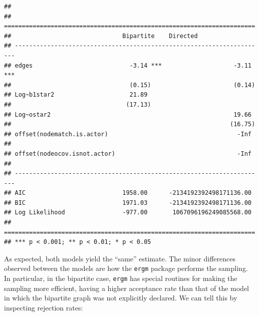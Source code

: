 \documentclass[]{book}
\newenvironment{Shaded}{\begin{snugshade}}{\end{snugshade}}
\newcommand{\DataTypeTok}[1]{\textcolor[rgb]{0.13,0.29,0.53}{#1}}
\newcommand{\DecValTok}[1]{\textcolor[rgb]{0.00,0.00,0.81}{#1}}
\newcommand{\ErrorTok}[1]{\textcolor[rgb]{0.64,0.00,0.00}{\textbf{#1}}}
\newcommand{\KeywordTok}[1]{\textcolor[rgb]{0.13,0.29,0.53}{\textbf{#1}}}
\newcommand{\NormalTok}[1]{#1}
\newcommand{\OperatorTok}[1]{\textcolor[rgb]{0.81,0.36,0.00}{\textbf{#1}}}
\newcommand{\StringTok}[1]{\textcolor[rgb]{0.31,0.60,0.02}{#1}}
\begin{document}
\begin{verbatim}
## 
## ======================================================================
##                               Bipartite    Directed                   
## ----------------------------------------------------------------------
## edges                           -3.14 ***                    -3.11 ***
##                                 (0.15)                       (0.14)   
## Log~b1star2                     21.89                                 
##                                (17.13)                                
## Log~ostar2                                                   19.66    
##                                                             (16.75)   
## offset(nodematch.is.actor)                                    -Inf    
##                                                                       
## offset(nodeocov.isnot.actor)                                  -Inf    
##                                                                       
## ----------------------------------------------------------------------
## AIC                           1958.00      -2134192392498171136.00    
## BIC                           1971.03      -2134192392498171136.00    
## Log Likelihood                -977.00       1067096196249085568.00    
## ======================================================================
## *** p < 0.001; ** p < 0.01; * p < 0.05
\end{verbatim}

As expected, both models yield the ``same'' estimate. The minor differences
observed between the models are how the \texttt{ergm} package performs
the sampling. In particular, in the bipartite case, \texttt{ergm} has special
routines for making the sampling more efficient, having a higher acceptance
rate than that of the model in which the bipartite graph was not explicitly
declared. We can tell this by inspecting rejection rates:

\begin{Shaded}
\end{Shaded}
\end{document}
